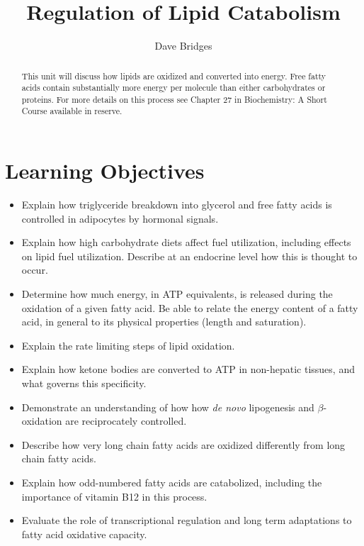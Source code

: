 \documentclass{tufte-handout}
\title{Regulation of Lipid Catabolism}
\author{Dave Bridges}
\date{}  %
\begin{document}
\maketitle%

\begin{abstract}
\noindent  This unit will discuss how lipids are oxidized and converted into energy.  Free fatty acids contain substantially more energy per molecule than either carbohydrates or proteins.  For more details on this process see Chapter 27 in Biochemistry: A Short Course available in reserve\cite{Berg2015}.
\end{abstract}

\tableofcontents

\pagebreak
\section{Learning Objectives}

\begin{itemize}
\item Explain how triglyceride breakdown into glycerol and free fatty acids is controlled in adipocytes by hormonal signals.
\item Explain how high carbohydrate diets affect fuel utilization, including effects on lipid fuel utilization.  Describe at an endocrine level how this is thought to occur.
\item Determine how much energy, in ATP equivalents, is released during the oxidation of a given fatty acid.  Be able to relate the energy content of a fatty acid, in general to its physical properties (length and saturation).
\item Explain the rate limiting steps of lipid oxidation.
\item Explain how ketone bodies are converted to ATP in non-hepatic tissues, and what governs this specificity.
\item Demonstrate an understanding of how how \textit{de novo} lipogenesis and $\beta$-oxidation are reciprocately controlled.
\item Describe how very long chain fatty acids are oxidized differently from long chain fatty acids.
\item Explain how odd-numbered fatty acids are catabolized, including the importance of vitamin B12 in this process. 
\item Evaluate the role of transcriptional regulation and long term adaptations to fatty acid oxidative capacity.
\end{itemize}
\end{document}
